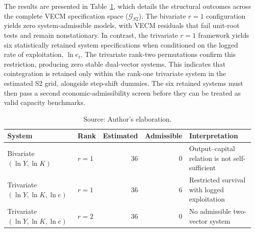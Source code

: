 \documentclass[11pt]{article}
\begin{document}
The results are presented in Table~\ref{tab:s2_admissibility_outcomes}, which details the structural outcomes across the complete VECM specification space ($\mathcal{G}_{S2}$). The bivariate $r=1$ configuration yields zero system-admissible models, with VECM residuals that fail unit-root tests and remain nonstationary. In contrast, the trivariate $r=1$ framework yields six statistically retained system specifications when conditioned on the logged rate of exploitation, $\ln e_t$. The trivariate rank-two permutations confirm this restriction, producing zero stable dual-vector systems. This indicates that cointegration is retained only within the rank-one trivariate system in the estimated S2 grid, alongside step-shift dummies. The six retained systems must then pass a second economic-admissibility screen before they can be treated as valid capacity benchmarks.

\begin{table}[H]
\centering
\caption{S2 System Admissibility Outcomes}
\label{tab:s2_admissibility_outcomes}
\small
\begin{tabular}{llrrp{5.0cm}}
\toprule
System & Rank & Estimated & Admissible & Interpretation \\
\midrule
\midrule
Bivariate $(\ln Y,\ln K)$ & $r=1$ & 36 & 0 & Output--capital relation is not self-sufficient \\
Trivariate $(\ln Y,\ln K,\ln e)$ & $r=1$ & 36 & 6 & Restricted survival with logged exploitation \\
Trivariate $(\ln Y,\ln K,\ln e)$ & $r=2$ & 36 & 0 & No admissible two-vector system \\
\bottomrule
\end{tabular}
\caption*{Source: Author's elaboration.}
\end{table}
\end{document}
